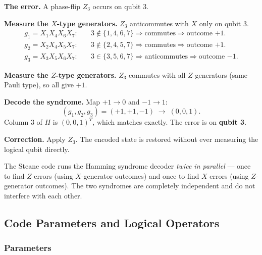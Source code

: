 \documentclass[11pt, a4paper]{article}
\theoremstyle{definition}
\theoremstyle{plain}
\theoremstyle{remark}
\begin{document}
\begin{workedexample}

\textbf{The error.}  A phase-flip $Z_3$ occurs on qubit 3.

\medskip\noindent
\textbf{Measure the $X$-type generators.}
$Z_3$ anticommutes with $X$ only on qubit 3.
\begin{align*}
  g_1 = X_1 X_4 X_6 X_7:&\quad
    3 \notin \{1,4,6,7\} \Rightarrow \text{commutes}
    \Rightarrow \text{outcome } {+1}.\\
  g_2 = X_2 X_4 X_5 X_7:&\quad
    3 \notin \{2,4,5,7\} \Rightarrow \text{commutes}
    \Rightarrow \text{outcome } {+1}.\\
  g_3 = X_3 X_5 X_6 X_7:&\quad
    3 \in \{3,5,6,7\} \Rightarrow \text{anticommutes}
    \Rightarrow \text{outcome } {-1}.
\end{align*}

\textbf{Measure the $Z$-type generators.}  $Z_3$ commutes with all
$Z$-generators (same Pauli type), so all give $+1$.

\medskip\noindent
\textbf{Decode the syndrome.}  Map $+1\to0$ and $-1\to1$:
\[
  (g_1,g_2,g_3) = (+1,+1,-1) \;\longrightarrow\; (0,0,1).
\]
Column 3 of $H$ is $(0,0,1)^T$, which matches exactly.
The error is on \textbf{qubit 3}.

\medskip\noindent
\textbf{Correction.}  Apply $Z_3$.  The encoded state is restored
without ever measuring the logical qubit directly.

\end{workedexample}

\begin{keypoint}
The Steane code runs the Hamming syndrome decoder \emph{twice in
parallel} --- once to find $Z$ errors (using $X$-generator outcomes)
and once to find $X$ errors (using $Z$-generator outcomes).  The two
syndromes are completely independent and do not interfere with each
other.
\end{keypoint}

\subsection{Code Parameters and Logical Operators}

\subsubsection{Parameters}
\end{document}

